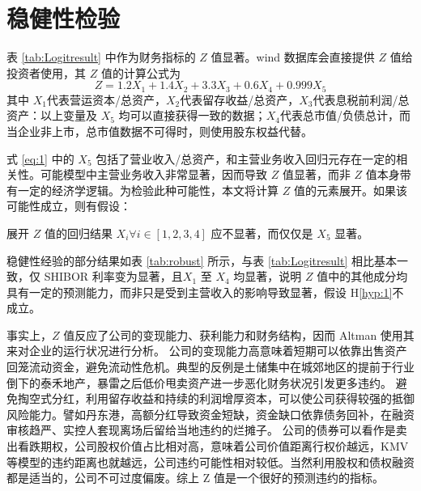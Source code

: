 \chapter{稳健性检验}
表 \ref{tab:Logitresult} 中作为财务指标的 \(Z\) 值显著。wind 数据库会直接提供 \(Z\) 值给投资者使用，其 \(Z\) 值的计算公式为
\begin{equation}
	\label{eq:1}
	Z=1.2X_1+1.4X_2+3.3X_3+0.6X_4+0.999X_5
\end{equation}
其中 \(X_1\)代表营运资本/总资产，\(X_2\)代表留存收益/总资产，\(X_3\)代表息税前利润/总资产：以上变量及 \(X_5\) 均可以直接获得一致的数据；\(X_4\)代表总市值/负债总计，而当企业非上市，总市值数据不可得时，则使用股东权益代替。

式 \ref{eq:1} 中的 \(X_{5}\) 包括了营业收入/总资产，和主营业务收入回归元存在一定的相关性。可能模型中主营业务收入非常显著，因而导致 \(Z\) 值显著，而非 \(Z\) 值本身带有一定的经济学逻辑。为检验此种可能性，本文将计算 \(Z\) 值的元素展开。如果该可能性成立，则有假设：

\begin{hyp}
	\label{hyp:1}
	展开 \(Z\) 值的回归结果 \(X_i\forall i\in [1,2,3,4] \) 应不显著，而仅仅是 \(X_5\) 显著。
\end{hyp}



稳健性经验的部分结果如表
\ref{tab:robust}
所示，与表 \ref{tab:Logitresult} 相比基本一致，仅 SHIBOR 利率变为显著，且\(X_1\) 至 \(X_4\) 均显著，说明 \(Z\) 值中的其他成分均具有一定的预测能力，而非只是受到主营收入的影响导致显著，假设 H\ref{hyp:1}不成立。

事实上，\(Z\) 值反应了公司的变现能力、获利能力和财务结构，因而 Altman 使用其来对企业的运行状况进行分析。
公司的变现能力高意味着短期可以依靠出售资产回笼流动资金，避免流动性危机。典型的反例是土储集中在城郊地区的提前于行业倒下的泰禾地产，暴雷之后低价甩卖资产进一步恶化财务状况引发更多违约。
避免掏空式分红，利用留存收益和持续的利润增厚资本，可以使公司获得较强的抵御风险能力。譬如丹东港，高额分红导致资金短缺，资金缺口依靠债务回补，在融资审核趋严、实控人套现离场后留给当地违约的烂摊子。
公司的债券可以看作是卖出看跌期权，公司股权价值占比相对高，意味着公司价值距离行权价越远，KMV 等模型的违约距离也就越远，公司违约可能性相对较低。当然利用股权和债权融资都是适当的，公司不可过度偏废。综上 Z 值是一个很好的预测违约的指标。
